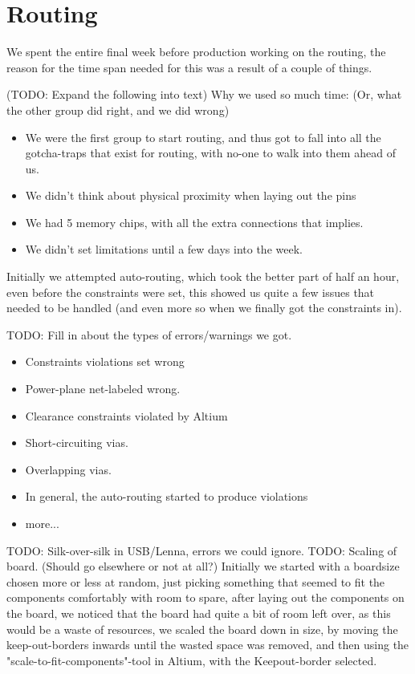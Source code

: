 \section {Routing}

We spent the entire final week before production working on the routing,
the reason for the time span needed for this was a result of a couple of
things.

(TODO: Expand the following into text)
Why we used so much time: (Or, what the other group did right, and we did wrong)
\begin {itemize}
\item We were the first group to start routing, and thus got to fall into all the gotcha-traps that
exist for routing, with no-one to walk into them ahead of us.
\item We didn't think about physical proximity when laying out the pins
\item We had 5 memory chips, with all the extra connections that implies.
\item We didn't set limitations until a few days into the week.
\end {itemize}

Initially we attempted auto-routing, which took the better part of half an hour,
even before the constraints were set, this showed us quite a few issues that needed
to be handled (and even more so when we finally got the constraints in).

TODO: Fill in about the types of errors/warnings we got.
\begin{itemize}
\item Constraints violations set wrong
\item Power-plane net-labeled wrong.
\item Clearance constraints violated by Altium
\item Short-circuiting vias.
\item Overlapping vias.
\item In general, the auto-routing started to produce violations 
\item more...
\end{itemize}
TODO: Silk-over-silk in USB/Lenna, errors we could ignore.
TODO: Scaling of board. (Should go elsewhere or not at all?)
Initially we started with a boardsize chosen more or less at random, just picking something
that seemed to fit the components comfortably with room to spare, after laying out the components
on the board, we noticed that the board had quite a bit of room left over, as this would be a waste
of resources, we scaled the board down in size, by moving the keep-out-borders inwards until the wasted
space was removed, and then using the "scale-to-fit-components"-tool in Altium, with the Keepout-border
selected.

